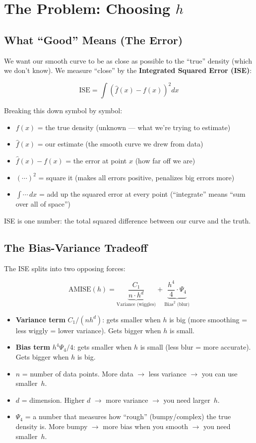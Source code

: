 \documentclass[12pt]{article}
\newcommand{\keyword}[1]{\textbf{\textcolor{blue!70!black}{#1}}}
\newcommand{\step}[1]{\begin{tcolorbox}[colback=blue!5,colframe=blue!50!black,title=Step-by-Step]\small #1\end{tcolorbox}}
\begin{document}
\section{The Problem: Choosing $h$}

\subsection{What ``Good'' Means (The Error)}

We want our smooth curve to be as close as possible to the ``true'' density (which we don't know). We measure ``close'' by the \keyword{Integrated Squared Error (ISE)}:

$$\text{ISE} = \int \left(\hat{f}(x) - f(x)\right)^2 dx$$

\step{
Breaking this down symbol by symbol:
\begin{itemize}
\item $f(x)$ = the true density (unknown --- what we're trying to estimate)
\item $\hat{f}(x)$ = our estimate (the smooth curve we drew from data)
\item $\hat{f}(x) - f(x)$ = the error at point $x$ (how far off we are)
\item $(\cdots)^2$ = square it (makes all errors positive, penalizes big errors more)
\item $\int \cdots\, dx$ = add up the squared error at every point (``integrate'' means ``sum over all of space'')
\end{itemize}
ISE is one number: the total squared difference between our curve and the truth.
}

\subsection{The Bias-Variance Tradeoff}

The ISE splits into two opposing forces:

$$\text{AMISE}(h) = \underbrace{\frac{C_1}{n \cdot h^d}}_{\text{Variance (wiggles)}} + \underbrace{\frac{h^4}{4} \cdot \Psi_4}_{\text{Bias}^2\text{ (blur)}}$$

\step{
\begin{itemize}
\item \textbf{Variance term} $C_1/(n h^d)$: gets smaller when $h$ is big (more smoothing = less wiggly = lower variance). Gets bigger when $h$ is small.
\item \textbf{Bias term} $h^4 \Psi_4 / 4$: gets smaller when $h$ is small (less blur = more accurate). Gets bigger when $h$ is big.
\item $n$ = number of data points. More data $\to$ less variance $\to$ you can use smaller~$h$.
\item $d$ = dimension. Higher $d$ $\to$ more variance $\to$ you need larger~$h$.
\item $\Psi_4$ = a number that measures how ``rough'' (bumpy/complex) the true density is. More bumpy $\to$ more bias when you smooth $\to$ you need smaller~$h$.
\end{itemize}
}
\end{document}
